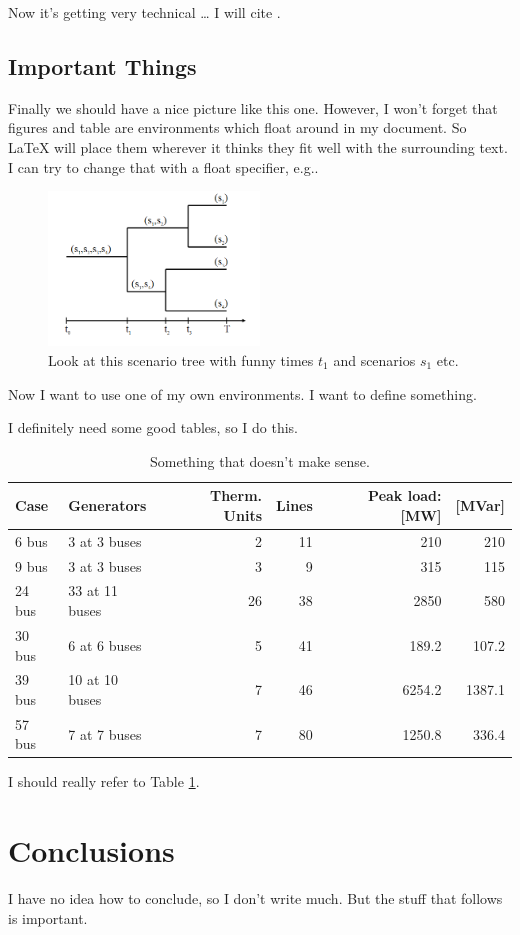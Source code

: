 \documentclass[11pt,twoside]{article}
\numberwithin{Theorem}{section}
\numberwithin{Definition}{section}
\numberwithin{Lemma}{section}
\numberwithin{Algorithm}{section}
\numberwithin{equation}{section}
\begin{document}
Now it's getting very technical \ldots{} I will cite \cite{shiina} \cite{groewe2001}.

\subsection{Important Things}
Finally we should have a nice picture like this one.
However, I won't forget that figures and table are environments which float around in my document.
So LaTeX will place them wherever it thinks they fit well with the surrounding text.
I can try to change that with a float specifier, e.g..

\begin{figure}[!ht]
\centering
\includegraphics[width=0.5\textwidth]{scenTree.png}
\caption{Look at this scenario tree with funny times $t_{1}$ and scenarios $s_{1}$ etc.}
\label{fig:scenarioTree}
\end{figure}
Now I want to use one of my own environments. I want to define something.

I definitely need some good tables, so I do this.
\begin{table}[!ht]
\centering
\begin{tabular}{|ll|rrrr|}
\hline
Case&Generators&Therm. Units&Lines&Peak load: [MW]&[MVar]\\
\hline\hline
6 bus&3 at 3 buses&2&11&210&210\\
9 bus&3 at 3 buses&3&9&315&115\\
24 bus&33 at 11 buses&26&38&2850&580\\
30 bus&6 at 6 buses&5&41&189.2&107.2\\
39 bus&10 at 10 buses&7&46&6254.2&1387.1\\
57 bus&7 at 7 buses&7&80&1250.8&336.4\\
\hline
\end{tabular}
\caption{Something that doesn't make sense.}
\label{tab:things}
\end{table}
I should really refer to Table \ref{tab:things}.


\section{Conclusions}
I have no idea how to conclude, so I don't write much. But the stuff that follows is important.
\clearpage
\end{document}
